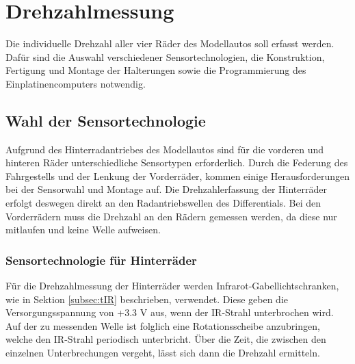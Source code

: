 \section{Drehzahlmessung}
\label{sec:RPM}
Die individuelle Drehzahl aller vier Räder des Modellautos soll erfasst werden. Dafür sind die Auswahl verschiedener Sensortechnologien, die Konstruktion, Fertigung und Montage der Halterungen sowie die Programmierung des Einplatinencomputers notwendig.

\subsection{Wahl der Sensortechnologie}
\label{subsec:RPMchoice}
Aufgrund des Hinterradantriebes des Modellautos sind für die vorderen und hinteren Räder unterschiedliche Sensortypen erforderlich. Durch die Federung des Fahrgestells und der Lenkung der Vorderräder, kommen einige Herausforderungen bei der Sensorwahl und Montage auf. Die Drehzahlerfassung der Hinterräder erfolgt deswegen direkt an den Radantriebswellen des Differentials. Bei den Vorderrädern muss die Drehzahl an den Rädern gemessen werden, da diese nur mitlaufen und keine Welle aufweisen.\\
\subsubsection{Sensortechnologie für Hinterräder}
\label{subsubsec:RPMchoiceRear}
Für die Drehzahlmessung der Hinterräder werden Infrarot-Gabellichtschranken, wie in Sektion \ref{subsec:tIR} beschrieben, verwendet. Diese geben die Versorgungsspannung von +3.3 V aus, wenn der \ac{IR}-Strahl unterbrochen wird. Auf der zu messenden Welle ist folglich eine Rotationsscheibe anzubringen, welche den \ac{IR}-Strahl periodisch unterbricht. Über die Zeit, die zwischen den einzelnen Unterbrechungen vergeht, lässt sich dann die Drehzahl ermitteln.\\
